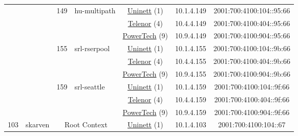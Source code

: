 \begin{small}
\begin{center}
\begin{longtable}{|c|c|c|c|c|c|c|c|}
  &  & \multirow{3}{*}{\tiny{149}} & \multicolumn{1}{|l|}{\multirow{3}{*}{\tiny{hu-multipath}}} & \multicolumn{2}{|c|}{\tiny{\href{https://www.uninett.no}{Uninett} (1)}} & \tiny{10.1.4.149} & \tiny{2001:700:4100:104::95:66} \\* \cline{5-5}\cline{6-6}\cline{7-7}\cline{8-8}
  &  &  &  & \multicolumn{2}{|c|}{\tiny{\href{https://www.telenor.no}{Telenor} (4)}} & \tiny{10.4.4.149} & \tiny{2001:700:4100:404::95:66} \\* \cline{5-5}\cline{6-6}\cline{7-7}\cline{8-8}
  &  &  &  & \multicolumn{2}{|c|}{\tiny{\href{http://www.powertech.no}{PowerTech} (9)}} & \tiny{10.9.4.149} & \tiny{2001:700:4100:904::95:66} \\* \cline{3-3}\cline{4-4}\cline{5-5}\cline{6-6}\cline{7-7}\cline{8-8}
  &  & \multirow{3}{*}{\tiny{155}} & \multicolumn{1}{|l|}{\multirow{3}{*}{\tiny{srl-rserpool}}} & \multicolumn{2}{|c|}{\tiny{\href{https://www.uninett.no}{Uninett} (1)}} & \tiny{10.1.4.155} & \tiny{2001:700:4100:104::9b:66} \\* \cline{5-5}\cline{6-6}\cline{7-7}\cline{8-8}
  &  &  &  & \multicolumn{2}{|c|}{\tiny{\href{https://www.telenor.no}{Telenor} (4)}} & \tiny{10.4.4.155} & \tiny{2001:700:4100:404::9b:66} \\* \cline{5-5}\cline{6-6}\cline{7-7}\cline{8-8}
  &  &  &  & \multicolumn{2}{|c|}{\tiny{\href{http://www.powertech.no}{PowerTech} (9)}} & \tiny{10.9.4.155} & \tiny{2001:700:4100:904::9b:66} \\* \cline{3-3}\cline{4-4}\cline{5-5}\cline{6-6}\cline{7-7}\cline{8-8}
  &  & \multirow{3}{*}{\tiny{159}} & \multicolumn{1}{|l|}{\multirow{3}{*}{\tiny{srl-seattle}}} & \multicolumn{2}{|c|}{\tiny{\href{https://www.uninett.no}{Uninett} (1)}} & \tiny{10.1.4.159} & \tiny{2001:700:4100:104::9f:66} \\* \cline{5-5}\cline{6-6}\cline{7-7}\cline{8-8}
  &  &  &  & \multicolumn{2}{|c|}{\tiny{\href{https://www.telenor.no}{Telenor} (4)}} & \tiny{10.4.4.159} & \tiny{2001:700:4100:404::9f:66} \\* \cline{5-5}\cline{6-6}\cline{7-7}\cline{8-8}
  &  &  &  & \multicolumn{2}{|c|}{\tiny{\href{http://www.powertech.no}{PowerTech} (9)}} & \tiny{10.9.4.159} & \tiny{2001:700:4100:904::9f:66} \\ \hline
 \multirow{33}{*}{\tiny{103}} & \multicolumn{1}{|l|}{\multirow{33}{*}{\tiny{skarven}}} & \multicolumn{2}{|c|}{\multirow{3}{*}{\tiny{Root Context}}} & \multicolumn{2}{|c|}{\tiny{\href{https://www.uninett.no}{Uninett} (1)}} & \tiny{10.1.4.103} & \tiny{2001:700:4100:104::67} \\* \cline{5-5}\cline{6-6}\cline{7-7}\cline{8-8}

\end{longtable}
\end{center}
\end{small}
